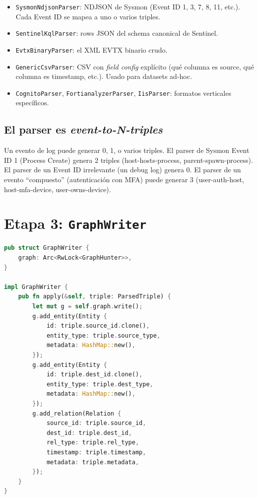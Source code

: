 \begin{itemize}
    \item \texttt{SysmonNdjsonParser}: NDJSON de Sysmon (Event ID
    1, 3, 7, 8, 11, etc.). Cada Event ID se mapea a uno o varios
    triples.
    \item \texttt{SentinelKqlParser}: rows JSON del schema canonical
    de Sentinel.
    \item \texttt{EvtxBinaryParser}: el XML EVTX binario crudo.
    \item \texttt{GenericCsvParser}: CSV con \emph{field config}
    explícito (qué columna es source, qué columna es timestamp,
    etc.). Usado para datasets ad-hoc.
    \item \texttt{CognitoParser}, \texttt{FortianalyzerParser},
    \texttt{IisParser}: formatos verticales específicos.
\end{itemize}

\subsection{El parser es \emph{event-to-N-triples}}

Un evento de log puede generar 0, 1, o varios triples. El parser de
Sysmon Event ID 1 (Process Create) genera 2 triples (host-hosts-process,
parent-spawn-process). El parser de un Event ID irrelevante (un
debug log) genera 0. El parser de un evento ``compuesto''
(autenticación con MFA) puede generar 3 (user-auth-host,
host-mfa-device, user-owns-device).

\section{Etapa 3: \texttt{GraphWriter}}

\begin{lstlisting}[language=Rust]
pub struct GraphWriter {
    graph: Arc<RwLock<GraphHunter>>,
}

impl GraphWriter {
    pub fn apply(&self, triple: ParsedTriple) {
        let mut g = self.graph.write();
        g.add_entity(Entity {
            id: triple.source_id.clone(),
            entity_type: triple.source_type,
            metadata: HashMap::new(),
        });
        g.add_entity(Entity {
            id: triple.dest_id.clone(),
            entity_type: triple.dest_type,
            metadata: HashMap::new(),
        });
        g.add_relation(Relation {
            source_id: triple.source_id,
            dest_id: triple.dest_id,
            rel_type: triple.rel_type,
            timestamp: triple.timestamp,
            metadata: triple.metadata,
        });
    }
}
\end{lstlisting}

